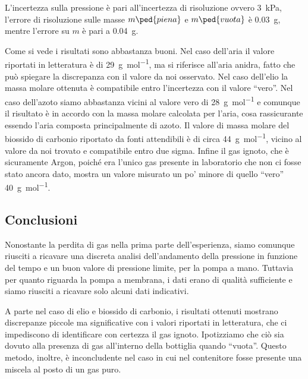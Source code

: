 L'incertezza sulla pressione è pari all'incertezza di risoluzione ovvero \SI{3}{\kilo\pascal}, l'errore di risoluzione sulle masse $m\ped{piena}$ e $m\ped{vuota}$ è \SI{0.03}{\gram}, mentre
l'errore su $m$ è pari a \SI{0.04}{\gram}.

Come si vede i risultati sono abbastanza buoni. Nel caso dell'aria il valore riportati in letteratura è di \SI{29}{\gram\per\mole},
ma si riferisce all'aria anidra, fatto che può spiegare la discrepanza con il valore da noi osservato. Nel caso dell'elio
la massa molare ottenuta è compatibile entro l'incertezza con il valore ``vero''. Nel caso dell'azoto siamo
abbastanza vicini al valore vero di \SI{28}{\gram\per\mole} e comunque il risultato è in accordo con la massa molare calcolata per l'aria,
cosa rassicurante essendo l'aria composta principalmente di azoto. Il valore di massa molare del biossido di carbonio
riportato da fonti attendibili è di circa \SI{44}{\gram\per\mole}, vicino al valore da noi trovato e compatibile entro due sigma.
Infine il gas ignoto, che è sicuramente Argon, poiché era l'unico gas presente in laboratorio che non ci fosse stato
ancora dato, mostra un valore misurato un po' minore di quello ``vero'' \SI{40}{\gram\per\mole}.

\subsection{Conclusioni}

Nonostante la perdita di gas nella prima parte dell'esperienza, siamo comunque riusciti a ricavare una discreta analisi dell'andamento della pressione in funzione del tempo e un buon valore di pressione limite, per la pompa a mano. Tuttavia per quanto riguarda la pompa a membrana, i dati erano di qualità sufficiente e siamo riusciti a ricavare solo alcuni dati indicativi.

A parte nel caso di elio e biossido di carbonio, i risultati ottenuti mostrano discrepanze piccole ma significative
con i valori riportati in letteratura, che ci impediscono di identificare con certezza il gas ignoto. Ipotizziamo che ciò sia dovuto alla presenza di gas all'interno
della bottiglia quando ``vuota''.
Questo metodo, inoltre, è inconcludente nel caso in cui nel contenitore fosse presente una miscela al posto di un gas puro.
